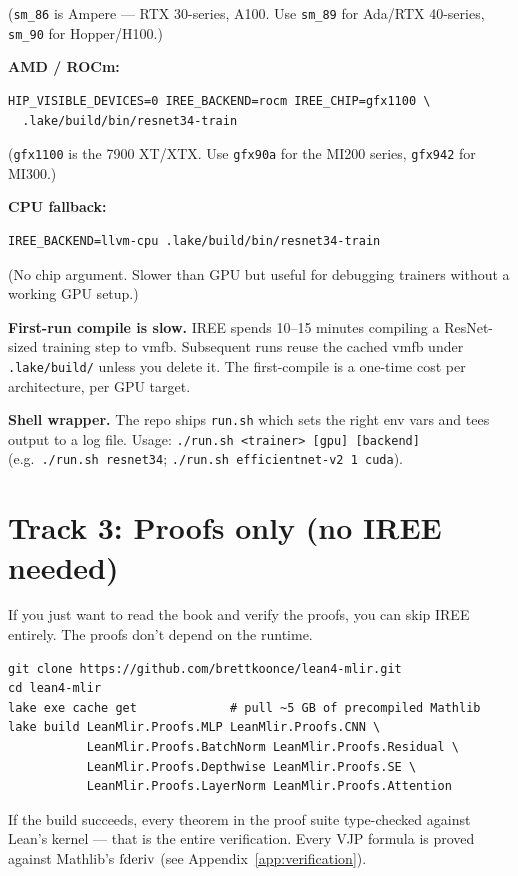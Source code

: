 \begin{enumerate}
    (\texttt{sm\_86} is Ampere --- RTX 30-series, A100. Use
    \texttt{sm\_89} for Ada/RTX 40-series, \texttt{sm\_90} for
    Hopper/H100.)

    \textbf{AMD / ROCm:}
\begin{verbatim}
HIP_VISIBLE_DEVICES=0 IREE_BACKEND=rocm IREE_CHIP=gfx1100 \
  .lake/build/bin/resnet34-train
\end{verbatim}

    (\texttt{gfx1100} is the 7900 XT/XTX. Use \texttt{gfx90a} for
    the MI200 series, \texttt{gfx942} for MI300.)

    \textbf{CPU fallback:}
\begin{verbatim}
IREE_BACKEND=llvm-cpu .lake/build/bin/resnet34-train
\end{verbatim}

    (No chip argument. Slower than GPU but useful for debugging
    trainers without a working GPU setup.)
\end{enumerate}

\textbf{First-run compile is slow.} IREE spends 10--15 minutes
compiling a ResNet-sized training step to vmfb. Subsequent runs
reuse the cached vmfb under \texttt{.lake/build/} unless you
delete it. The first-compile is a one-time cost per architecture,
per GPU target.

\textbf{Shell wrapper.} The repo ships \texttt{run.sh} which sets
the right env vars and tees output to a log file. Usage:
\texttt{./run.sh <trainer> [gpu] [backend]} (e.g.\
\texttt{./run.sh resnet34}; \texttt{./run.sh efficientnet-v2 1
cuda}).

\section*{Track 3: Proofs only (no IREE needed)}

If you just want to read the book and verify the proofs, you can
skip IREE entirely. The proofs don't depend on the runtime.

\begin{verbatim}
git clone https://github.com/brettkoonce/lean4-mlir.git
cd lean4-mlir
lake exe cache get             # pull ~5 GB of precompiled Mathlib
lake build LeanMlir.Proofs.MLP LeanMlir.Proofs.CNN \
           LeanMlir.Proofs.BatchNorm LeanMlir.Proofs.Residual \
           LeanMlir.Proofs.Depthwise LeanMlir.Proofs.SE \
           LeanMlir.Proofs.LayerNorm LeanMlir.Proofs.Attention
\end{verbatim}

If the build succeeds, every theorem in the proof suite type-checked
against Lean's kernel --- that is the entire verification. Every
VJP formula is proved against Mathlib's \(\operatorname{fderiv}\) (see
Appendix~\ref{app:verification}).

